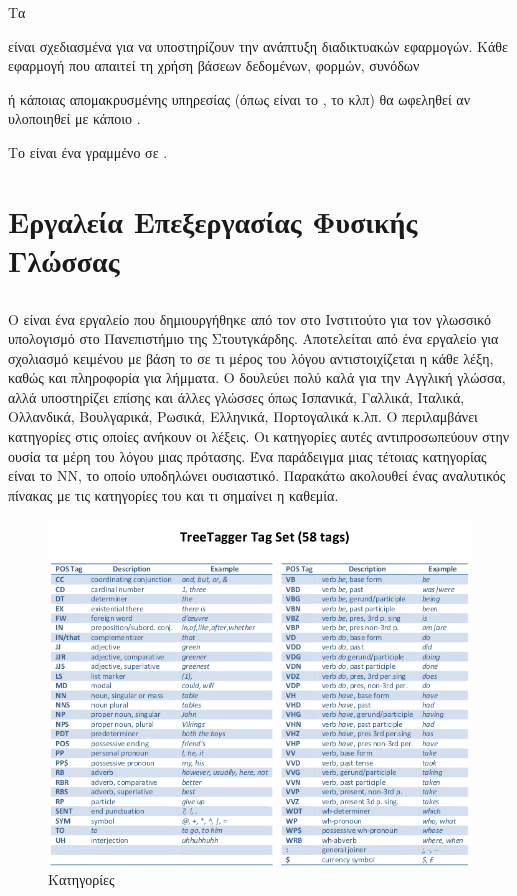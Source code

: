 Τα { είναι σχεδιασμένα για να υποστηρίζουν την ανάπτυξη διαδικτυακών εφαρμογών. 
Κάθε εφαρμογή που απαιτεί τη χρήση βάσεων δεδομένων, φορμών, συνόδων { 
ή κάποιας απομακρυσμένης υπηρεσίας (όπως είναι το {}, το {} κλπ) θα ωφεληθεί αν υλοποιηθεί με κάποιο {}.

\par Το {} \cite{Fl01} είναι ένα {} γραμμένο σε {}.

\section{Εργαλεία Επεξεργασίας Φυσικής Γλώσσας}

\subsection{}
Ο {} \cite{Tt01} είναι ένα εργαλείο που δημιουργήθηκε από τον {} στο Ινστιτούτο για τον γλωσσικό υπολογισμό στο Πανεπιστήμιο της Στουτγκάρδης. 
Αποτελείται από ένα εργαλείο για σχολιασμό κειμένου με βάση το σε τι μέρος του λόγου αντιστοιχίζεται η κάθε λέξη,
καθώς και πληροφορία για λήμματα. Ο {} δουλεύει πολύ καλά για την Αγγλική γλώσσα,
αλλά υποστηρίζει επίσης και άλλες γλώσσες όπως Ισπανικά, Γαλλικά, Ιταλικά, Ολλανδικά, Βουλγαρικά, Ρωσικά, Ελληνικά, Πορτογαλικά κ.λπ.
Ο {} περιλαμβάνει κατηγορίες στις οποίες ανήκουν οι λέξεις. Οι
κατηγορίες αυτές αντιπροσωπεύουν στην ουσία τα μέρη του λόγου μιας
πρότασης. Ένα παράδειγμα μιας τέτοιας κατηγορίας είναι το NN, το οποίο
υποδηλώνει ουσιαστικό. 
Παρακάτω ακολουθεί ένας αναλυτικός πίνακας με τις κατηγορίες του {} και τι σημαίνει η καθεμία.

\begin{figure}[!ht] \centering
	\includegraphics[scale=0.65]{static/figures/treetagger.png}
    \caption{Κατηγορίες {}}
    \label{}
\end{figure} 

}}
